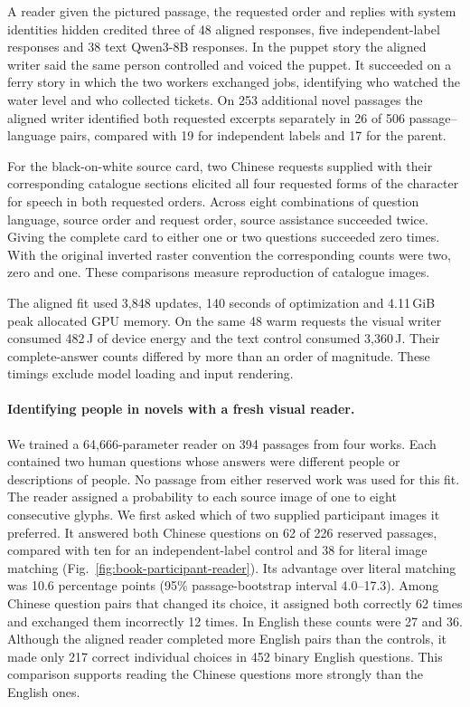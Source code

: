 \documentclass[12pt,a4paper]{article}
\providecommand{\DIFadd}[1]{{\protect\color{blue} \sf #1}} %
\begin{document}
\DIFadd{A reader given the pictured passage, the requested order and replies with system identities hidden credited three of 48 aligned responses, five independent-label responses and 38 text Qwen3-8B responses. In the puppet story the aligned writer said the same person controlled and voiced the puppet. It succeeded on a ferry story in which the two workers exchanged jobs, identifying who watched the water level and who collected tickets. On 253 additional novel passages the aligned writer identified both requested excerpts separately in 26 of 506 passage--language pairs, compared with 19 for independent labels and 17 for the parent.
}

\DIFadd{For the black-on-white source card, two Chinese requests supplied with their corresponding catalogue sections elicited all four requested forms of the character for speech in both requested orders. Across eight combinations of question language, source order and request order, source assistance succeeded twice. Giving the complete card to either one or two questions succeeded zero times. With the original inverted raster convention the corresponding counts were two, zero and one. These comparisons measure reproduction of catalogue images.
}

\DIFadd{The aligned fit used 3,848 updates, 140 seconds of optimization and 4.11\,GiB peak allocated GPU memory. On the same 48 warm requests the visual writer consumed 482\,J of device energy and the text control consumed 3,360\,J. Their complete-answer counts differed by more than an order of magnitude. These timings exclude model loading and input rendering.
}

\paragraph{\DIFadd{Identifying people in novels with a fresh visual reader.}}
\DIFadd{We trained a 64,666-parameter reader on 394 passages from four works. Each contained two human questions whose answers were different people or descriptions of people. No passage from either reserved work was used for this fit. The reader assigned a probability to each source image of one to eight consecutive glyphs. We first asked which of two supplied participant images it preferred. It answered both Chinese questions on 62 of 226 reserved passages, compared with ten for an independent-label control and 38 for literal image matching (Fig.~\ref{fig:book-participant-reader}). Its advantage over literal matching was 10.6 percentage points (95\% passage-bootstrap interval 4.0--17.3). Among Chinese question pairs that changed its choice, it assigned both correctly 62 times and exchanged them incorrectly 12 times. In English these counts were 27 and 36. Although the aligned reader completed more English pairs than the controls, it made only 217 correct individual choices in 452 binary English questions. This comparison supports reading the Chinese questions more strongly than the English ones.
}
\end{document}
